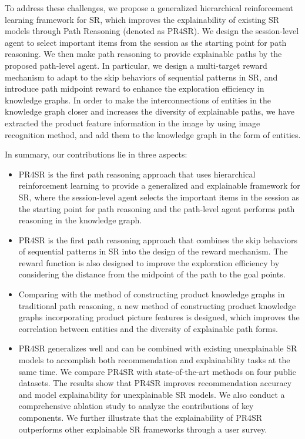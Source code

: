 \documentclass[10pt,journal,compsoc]{IEEEtran}
\begin{document}
To address these challenges, we propose a generalized hierarchical reinforcement learning framework for SR, which improves the explainability of existing SR models through Path Reasoning (denoted as PR4SR). 
We design the session-level agent to select important items from the session as the starting point for path reasoning. We then make path reasoning to provide explainable paths by the proposed path-level agent.
In particular, we design a multi-target reward mechanism to adapt to the skip behaviors of sequential patterns in SR, and introduce path midpoint reward to enhance the exploration efficiency in knowledge graphs.
In order to make the interconnections of entities in the knowledge graph closer and increases the diversity of explainable paths, we have extracted the product feature information in the image by using image recognition method, 
and add them to the knowledge graph in the form of entities.

In summary, our contributions lie in three aspects:
\begin{itemize}
\item PR4SR is the first path reasoning approach that uses hierarchical reinforcement learning to provide a generalized and explainable framework for SR, where the session-level agent selects the important items in the session as the starting point for path reasoning and the path-level agent performs path reasoning in the knowledge graph. 

\item PR4SR is the first path reasoning approach that combines the skip behaviors of sequential patterns in SR into the design of the reward mechanism. The reward function is also designed to improve the exploration efficiency by considering the distance from the midpoint of the path to the goal points.

\item Comparing with the method of constructing product knowledge graphs in traditional path reasoning, a new method of constructing product knowledge graphs incorporating product picture features is designed, which improves the correlation between entities and the diversity of explainable path forms.

\item PR4SR generalizes well and can be combined with existing unexplainable SR models to accomplish both recommendation and explainability tasks at the same time. We compare PR4SR with state-of-the-art methods on four public datasets. The results show that PR4SR improves recommendation accuracy and model explainability for unexplainable SR models. We also conduct a comprehensive ablation study to analyze the contributions of key components. We further illustrate that the explainability of PR4SR outperforms other explainable SR frameworks through a user survey.
\end{itemize}
\end{document}
